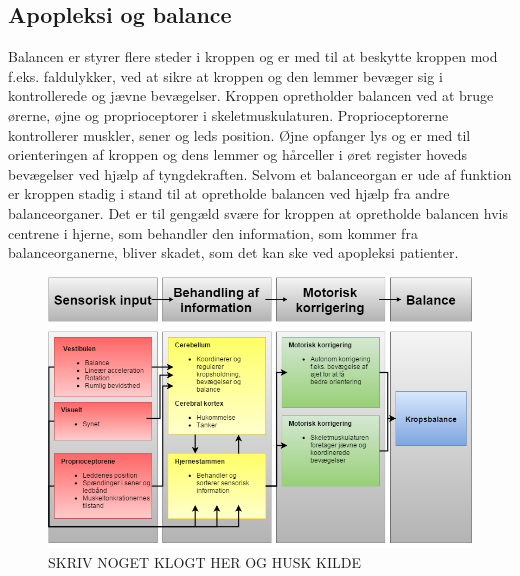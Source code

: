 \subsection{Apopleksi og balance}
Balancen er styrer flere steder i kroppen og er med til at beskytte kroppen mod f.eks. faldulykker, ved at sikre at kroppen og den lemmer bevæger sig i kontrollerede og jævne bevægelser. Kroppen opretholder balancen ved at bruge ørerne, øjne og proprioceptorer i skeletmuskulaturen. Proprioceptorerne kontrollerer muskler, sener og leds position. Øjne opfanger lys og er med til orienteringen af kroppen og dens lemmer og hårceller i øret register hoveds bevægelser ved hjælp af tyngdekraften. Selvom et balanceorgan er ude af funktion er kroppen stadig i stand til at opretholde balancen ved hjælp fra andre balanceorganer. Det er til gengæld svære for kroppen at opretholde balancen hvis centrene i hjerne, som behandler den information, som kommer fra balanceorganerne, bliver skadet, som det kan ske ved apopleksi patienter. \cite{Martini2012}

\begin{figure}[H]
	\centering
	\includegraphics[scale=0.8]{figures/bProblemanalyse/Balance-Flowdiagram.png}
	\caption{SKRIV NOGET KLOGT HER OG HUSK KILDE}
	\label{}
\end{figure}